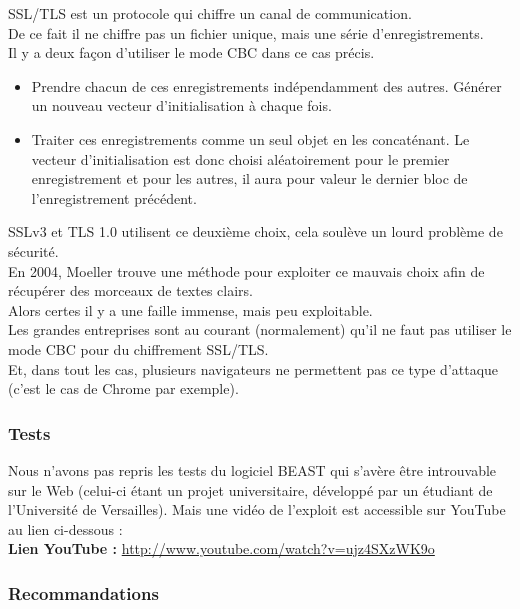 			SSL/TLS est un protocole qui chiffre un canal de communication.\\
			De ce fait il ne chiffre pas un fichier unique, mais une série d'enregistrements.\\
			Il y a deux façon d'utiliser le mode CBC dans ce cas précis.
			\begin{itemize}
			\item Prendre chacun de ces enregistrements indépendamment des autres. Générer un nouveau vecteur d'initialisation à chaque fois.
			\item Traiter ces enregistrements comme un seul objet en les concaténant. Le vecteur d'initialisation est donc choisi aléatoirement pour le premier enregistrement et pour les autres, il aura pour valeur le dernier bloc de l'enregistrement précédent.
			\end{itemize}
			
			SSLv3 et TLS 1.0 utilisent ce deuxième choix, cela soulève un lourd problème de sécurité.\\
			
			En 2004, Moeller \cite{moeller2004cbc} trouve une méthode pour exploiter ce mauvais choix afin de récupérer des morceaux de textes clairs.\\
			
			Alors certes il y a une faille immense, mais peu exploitable.\\
			Les grandes entreprises sont au courant (normalement) qu'il ne faut pas utiliser le mode CBC pour du chiffrement SSL/TLS.\\
			Et, dans tout les cas, plusieurs navigateurs ne permettent pas ce type d'attaque (c'est le cas de Chrome par exemple).\\
			
		\subsubsection{Tests}
			
			Nous n'avons pas repris les tests du logiciel BEAST qui s'avère être introuvable sur le Web (celui-ci étant un projet universitaire, développé par un étudiant de l'Université de Versailles). Mais une vidéo de l'exploit est accessible sur YouTube au lien ci-dessous : \\
			
			\textbf{Lien YouTube : } \href{http://www.youtube.com/watch?v=ujz4SXzWK9o} {http://www.youtube.com/watch?v=ujz4SXzWK9o}
		
		\subsubsection{Recommandations}

